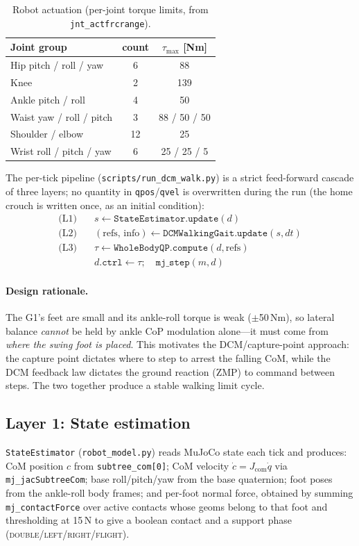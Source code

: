 \documentclass[10pt,a4paper]{article}
\providecommand{\toprule}{\hline\hline}
\providecommand{\midrule}{\hline}
\providecommand{\bottomrule}{\hline\hline}
\newcommand{\SI}[2]{#1\,#2}          %
\newcommand{\code}[1]{\texttt{\small #1}}
\begin{document}
\begin{table}[h]
\centering\small
\caption{Robot actuation (per-joint torque limits, from \code{jnt\_actfrcrange}).}
\label{tab:robot}
\begin{tabular}{lcc}
\toprule
Joint group & count & $\tau_{\max}$ [Nm]\\
\midrule
Hip pitch / roll / yaw & 6 & 88 \\
Knee & 2 & 139 \\
Ankle pitch / roll & 4 & 50 \\
Waist yaw / roll / pitch & 3 & 88 / 50 / 50 \\
Shoulder / elbow & 12 & 25 \\
Wrist roll / pitch / yaw & 6 & 25 / 25 / 5 \\
\bottomrule
\end{tabular}
\end{table}

The per-tick pipeline (\code{scripts/run\_dcm\_walk.py}) is a strict feed-forward
cascade of three layers; no quantity in \code{qpos}/\code{qvel} is overwritten
during the run (the home crouch is written once, as an initial condition):
\begin{align*}
\text{(L1)}\quad & s \leftarrow \texttt{StateEstimator.update}(d)\\
\text{(L2)}\quad & (\text{refs},\,\text{info}) \leftarrow \texttt{DCMWalkingGait.update}(s,dt)\\
\text{(L3)}\quad & \tau \leftarrow \texttt{WholeBodyQP.compute}(d,\text{refs})\\
                 & d.\texttt{ctrl}\leftarrow\tau;\quad \texttt{mj\_step}(m,d)
\end{align*}

\paragraph{Design rationale.}
The G1's feet are small and its ankle-roll torque is weak ($\pm$\SI{50}{Nm}), so
lateral balance \emph{cannot} be held by ankle CoP modulation alone---it must come
from \emph{where the swing foot is placed}. This motivates the DCM/capture-point
approach: the capture point dictates where to step to arrest the falling CoM,
while the DCM feedback law dictates the ground reaction (ZMP) to command between
steps. The two together produce a stable walking limit cycle.

\subsection{Layer 1: State estimation}
\code{StateEstimator} (\code{robot\_model.py}) reads MuJoCo state each tick and
produces: CoM position $c$ from \code{subtree\_com[0]}; CoM velocity
$\dot c = J_{\text{com}}\dot q$ via \code{mj\_jacSubtreeCom}; base roll/pitch/yaw
from the base quaternion; foot poses from the ankle-roll body frames; and
per-foot normal force, obtained by summing \code{mj\_contactForce} over active
contacts whose geoms belong to that foot and thresholding at \SI{15}{N} to give a
boolean contact and a support phase (\textsc{double}/\textsc{left}/\textsc{right}/\textsc{flight}).
\end{document}
